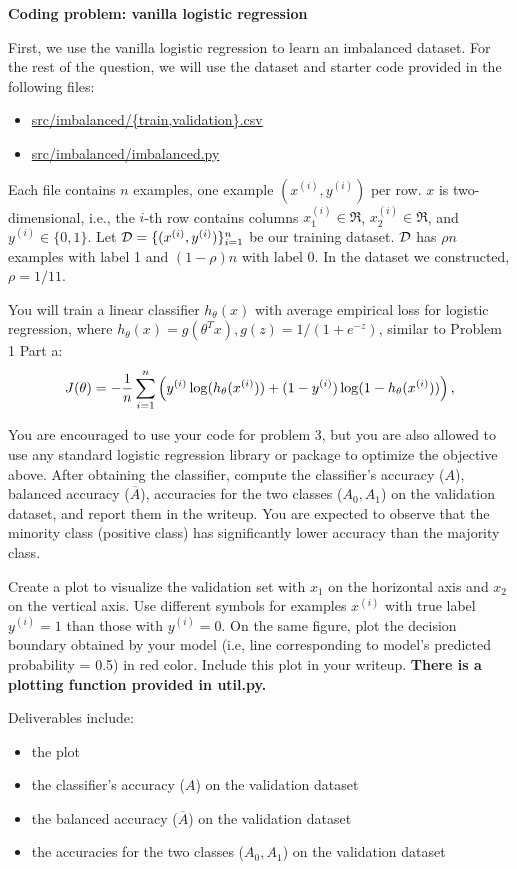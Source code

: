 \item {} \textbf{Coding problem: vanilla logistic regression}

First, we use the vanilla logistic regression to learn an imbalanced dataset. For the rest of the question, we will use the dataset and starter code provided in
the following files:
%
\begin{center}
	\begin{itemize}
		\item	\url{src/imbalanced/{train,validation}.csv}
		\item   \url{src/imbalanced/imbalanced.py}
	\end{itemize}
\end{center}


Each file contains $n$ examples, one example $(x^{(i)}, y^{(i)})$ per row. $x$ is two-dimensional, i.e., the $i$-th row contains columns $x^{(i)}_1\in\Re$,
$x^{(i)}_2\in\Re$, and $y^{(i)}\in\{0, 1\}$. Let $\mathcal{D}=\{(x^{(i)}, y^{(i)})\}_{i=1}^n$ be our training dataset. $\mathcal{D}$ has $\rho n$ examples with label 1 and $(1-\rho)n$ with label 0. In the dataset we constructed, $\rho=1/11$.

You will train a linear classifier $h_{\theta}(x)$ with average empirical loss for logistic regression, where $h_\theta(x)=g(\theta^T x), g(z)=1/(1+e^{-z})$, similar to Problem 1 Part a:
\begin{align*}
J(\theta) = -\frac{1}{{n}} \sum_{i=1}^{n} \left(y^{(i)}\log(h_{\theta}(x^{(i)}))
+  (1 - y^{(i)})\log(1 - h_{\theta}(x^{(i)}))\right), 
\end{align*}

You are encouraged to use your code for problem 3, but you are also allowed to use  any standard logistic regression library or package to optimize the objective above. After obtaining the classifier, 
compute the classifier's accuracy ($A$), balanced accuracy ($\overline{A}$), accuracies for the two classes ($A_0, A_1$) on the validation dataset, and report them in the writeup. You are expected to observe that the minority class (positive class) has significantly lower accuracy than the majority class. 


Create a plot to visualize the validation set with $x_1$ on the horizontal axis and $x_2$ on
the vertical axis. Use different symbols for examples $x^{(i)}$ with true label $y^{(i)} = 1$
than those with $y^{(i)} = 0$. On the same figure, plot the decision boundary obtained
by your model (i.e, line corresponding to model's predicted probability = 0.5) in red color. Include
this plot in your writeup. \textbf{There is a plotting function provided in util.py.}

Deliverables include:
\begin{itemize}
    \item the plot
    \item the classifier's accuracy ($A$) on the validation dataset
    \item the balanced accuracy ($\overline{A}$) on the validation dataset
    \item the accuracies for the two classes ($A_0, A_1$) on the validation dataset
\end{itemize}

